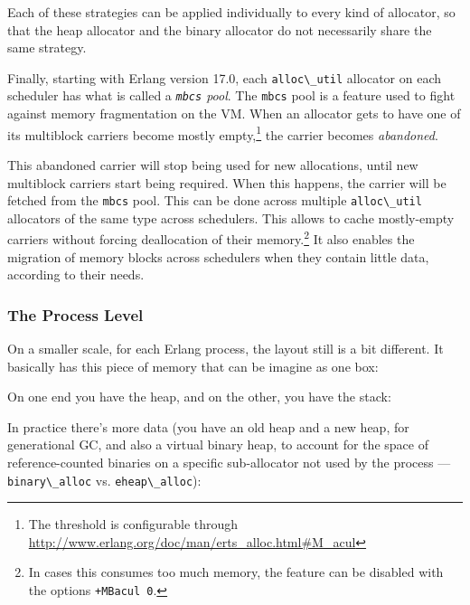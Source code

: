 \documentclass[11pt, oneside]{book}   	%
\newcommand{\term}[1]{\Verb`#1`}
\begin{document}
Each of these strategies can be applied individually to every kind of allocator, so that the heap allocator and the binary allocator do not necessarily share the same strategy.

Finally, starting with Erlang version 17.0, each \term{alloc\_util} allocator on each scheduler has what is called a \emph{\term{mbcs} pool}. The \term{mbcs} pool is a feature used to fight against memory fragmentation on the VM. When an allocator gets to have one of its multiblock carriers become mostly empty,\footnote{The threshold is configurable through \href{http://www.erlang.org/doc/man/erts\_alloc.html\#M\_acul}{http://www.erlang.org/doc/man/erts\_alloc.html\#M\_acul}} the carrier becomes \emph{abandoned}. 

This abandoned carrier will stop being used for new allocations, until new multiblock carriers start being required. When this happens, the carrier will be fetched from the \term{mbcs} pool. This can be done across multiple \term{alloc\_util} allocators of the same type across schedulers. This allows to cache mostly-empty carriers without forcing deallocation of their memory.\footnote{In cases this consumes too much memory, the feature can be disabled with the options \term{+MBacul 0}.} It also enables the migration of memory blocks across schedulers when they contain little data, according to their needs.

\subsubsection{The Process Level}
\label{subsec:memory-process-level}

On a smaller scale, for each Erlang process, the layout still is a bit different. It basically has this piece of memory that can be imagine as one box:

\begin{VerbatimText}
[                  ]
\end{VerbatimText}

On one end you have the heap, and on the other, you have the stack:

\begin{VerbatimText}
\end{VerbatimText}

In practice there's more data (you have an old heap and a new heap, for generational GC, and also a virtual binary heap, to account for the space of reference-counted binaries on a specific sub-allocator not used by the process — \term{binary\_alloc} vs. \term{eheap\_alloc}):
\end{document}
